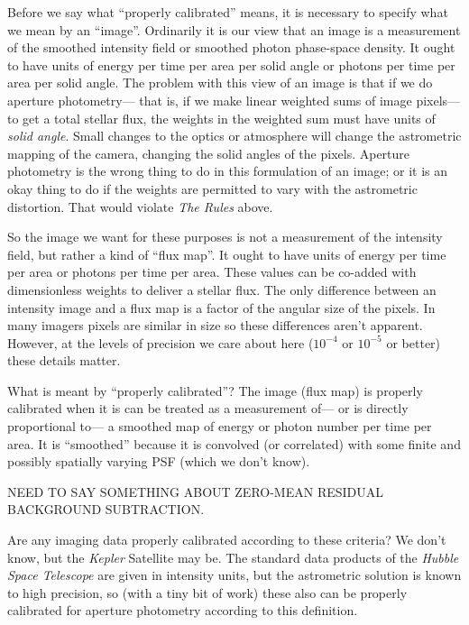 \documentclass[12pt, letterpaper, preprint]{aastex}
\newcommand{\project}[1]{\textsl{#1}}
\begin{document}
Before we say what ``properly calibrated'' means,
  it is necessary to specify what we mean by an ``image''.
Ordinarily it is our view that
  an image is a measurement of the smoothed intensity field
  or smoothed photon phase-space density.
It ought to have units of energy per time per area per solid angle
  or photons per time per area per solid angle.
The problem with this view of an image
  is that if we do aperture photometry---%
  that is, if we make linear weighted sums of image pixels---%
  to get a total stellar flux,
  the weights in the weighted sum must have units of \emph{solid angle}.
Small changes to the optics or atmosphere will change the astrometric mapping of the camera,
  changing the solid angles of the pixels.
Aperture photometry is the wrong thing to do in this formulation of an image;
  or it is an okay thing to do if the weights are permitted to vary with the astrometric distortion.
That would violate \emph{The Rules} above.

So the image we want for these purposes is not a measurement of the intensity field,
  but rather a kind of ``flux map''.
It ought to have units of energy per time per area
  or photons per time per area.
These values can be co-added with dimensionless weights to deliver a stellar flux.
The only difference between an intensity image and a flux map is a factor of
  the angular size of the pixels.
In many imagers pixels are similar in size so these differences aren't apparent.
However, at the levels of precision we care about here
  ($10^{-4}$ or $10^{-5}$ or better)
  these details matter.

What is meant by ``properly calibrated''?
The image (flux map) is properly calibrated when it is can be treated as a measurement of---%
  or is directly proportional to---%
  a smoothed map of energy or photon number per time per area.
It is ``smoothed'' because it is convolved (or correlated) with some finite
  and possibly spatially varying PSF
  (which we don't know).

NEED TO SAY SOMETHING ABOUT ZERO-MEAN RESIDUAL BACKGROUND SUBTRACTION.

Are any imaging data properly calibrated according to these criteria?
We don't know, but the \project{Kepler} Satellite may be.
The standard data products of the \project{Hubble Space Telescope}
  are given in intensity units,
  but the astrometric solution is known to high precision,
  so (with a tiny bit of work)
  these also can be properly calibrated for aperture photometry according to this definition.
\end{document}
